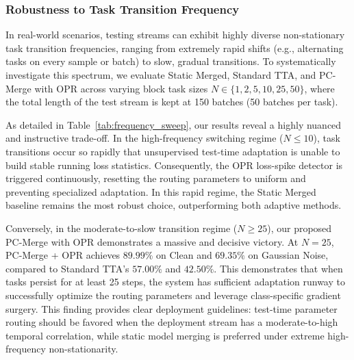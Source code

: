 \documentclass{article}
\theoremstyle{plain}
\theoremstyle{definition}
\theoremstyle{remark}
\begin{document}
\subsubsection{Robustness to Task Transition Frequency}
In real-world scenarios, testing streams can exhibit highly diverse non-stationary task transition frequencies, ranging from extremely rapid shifts (e.g., alternating tasks on every sample or batch) to slow, gradual transitions. To systematically investigate this spectrum, we evaluate Static Merged, Standard TTA, and PC-Merge with OPR across varying block task sizes $N \in \{1, 2, 5, 10, 25, 50\}$, where the total length of the test stream is kept at 150 batches (50 batches per task).

As detailed in Table~\ref{tab:frequency_sweep}, our results reveal a highly nuanced and instructive trade-off. In the high-frequency switching regime ($N \le 10$), task transitions occur so rapidly that unsupervised test-time adaptation is unable to build stable running loss statistics. Consequently, the OPR loss-spike detector is triggered continuously, resetting the routing parameters to uniform and preventing specialized adaptation. In this rapid regime, the Static Merged baseline remains the most robust choice, outperforming both adaptive methods.

Conversely, in the moderate-to-slow transition regime ($N \ge 25$), our proposed PC-Merge with OPR demonstrates a massive and decisive victory. At $N=25$, PC-Merge + OPR achieves $\mathbf{89.99\%}$ on Clean and $\mathbf{69.35\%}$ on Gaussian Noise, compared to Standard TTA's $57.00\%$ and $42.50\%$. This demonstrates that when tasks persist for at least 25 steps, the system has sufficient adaptation runway to successfully optimize the routing parameters and leverage class-specific gradient surgery. This finding provides clear deployment guidelines: test-time parameter routing should be favored when the deployment stream has a moderate-to-high temporal correlation, while static model merging is preferred under extreme high-frequency non-stationarity.
\end{document}
